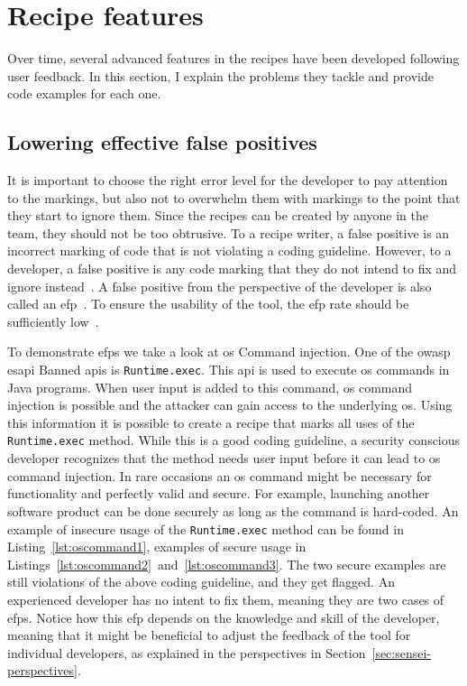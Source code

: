 \section{Recipe features}
\label{sec:features}

Over time, several advanced features in the recipes have been developed following user feedback.
In this section, I explain the problems they tackle and provide code examples for each one.

\subsection{Lowering effective false positives}
\label{sec:efp}
It is important to choose the right error level for the developer to pay attention to the markings, but also not to overwhelm them with markings to the point that they start to ignore them.
Since the recipes can be created by anyone in the team, they should not be too obtrusive.
To a recipe writer, a false positive is an incorrect marking of code that is not violating a coding guideline.
However, to a developer, a false positive is any code marking that they do not intend to fix and ignore instead~\cite{ayewah2007evaluating}.
A false positive from the perspective of the developer is also called an \gls{efp}~\cite{sadowski2015tricorder}.
To ensure the usability of the tool, the \gls{efp} rate should be sufficiently low~\cite{sadowski2015tricorder,johnson2013don}.

To demonstrate \glspl{efp} we take a look at \gls{os} Command injection.
One of the \gls{owasp} \gls{esapi} Banned \glspl{api} is \texttt{Runtime.exec}.
This \gls{api} is used to execute \gls{os} commands in Java programs.
When user input is added to this command, \gls{os} command injection is possible and the attacker can gain access to the underlying \gls{os}.
Using this information it is possible to create a recipe that marks all uses of the \texttt{Runtime.exec} method.
While this is a good coding guideline, a security conscious developer recognizes that the method needs user input before it can lead to \gls{os} command injection.
In rare occasions an \gls{os} command might be necessary for functionality and perfectly valid and secure.
For example, launching another software product can be done securely as long as the command is hard-coded.
An example of insecure usage of the \texttt{Runtime.exec} method can be found in Listing~\ref{lst:oscommand1}, examples of secure usage in Listings~\ref{lst:oscommand2}~and~\ref{lst:oscommand3}.
The two secure examples are still violations of the above coding guideline, and they get flagged.
An experienced developer has no intent to fix them, meaning they are two cases of \glspl{efp}.
Notice how this \gls{efp} depends on the knowledge and skill of the developer, meaning that it might be beneficial to adjust the feedback of the tool for individual developers, as explained in the perspectives in Section~\ref{sec:sensei-perspectives}.

